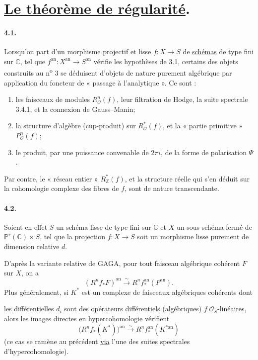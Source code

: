 \documentclass[10pt,leqno]{article}
\newcommand{\C}{\mathbb C}
\newcommand{\Z}{\mathbb Z}
\newcommand{\Pj}{\mathbb P}
\newcommand{\cO}{\mathcal O}
\theoremstyle{deligne}
\renewcommand{\underline}[1]{\uline{#1}}
\begin{document}
\section{\underline{Le théorème de régularité}.}

\paragraph{4.1.}
Lorsqu'on part d'un morphisme projectif et lisse $f:X\to S$ de \underline{schémas} de type fini sur $\C$, tel que $f^{\mathrm{an}}:X^{\mathrm{an}}\to S^{\mathrm{an}}$ vérifie les hypothèses de 3.1, certains des objets construits au n\textsuperscript{o} 3 se déduisent d'objets de nature purement algébrique par application du foncteur de « passage à l'analytique ». Ce sont :
\begin{enumerate}[label=\alph*)]
\item les faisceaux de modules $R_\cO^n(f)$, leur filtration de Hodge, la suite spectrale 3.4.1, et la connexion de Gauss--Manin;
\item la structure d'algèbre (cup-produit) sur $R_\cO^*(f)$, et la « partie primitive » $P_\cO^n(f)$;
\item le produit, par une puissance convenable de $2\pi i$, de la forme de polarisation $\Psi$.
\end{enumerate}
Par contre, le « réseau entier » $R_\Z^*(f)$, et la structure réelle qui s'en déduit sur la cohomologie complexe des fibres de $f$, sont de nature transcendante.

\paragraph{4.2.}
Soient en effet $S$ un schéma lisse de type fini sur $\C$ et $X$ un sous-schéma fermé de $\Pj^r(\C)\times S$, tel que la projection $f:X\to S$ soit un morphisme lisse purement de dimension relative $d$.

D'après la variante relative de GAGA, pour tout faisceau algébrique cohérent $F$ sur $X$, on a
\[
(R^nf_*F)^{\mathrm{an}}\xrightarrow{\sim}R^nf_*^{\mathrm{an}}(F^{\mathrm{an}}).
\]
Plus généralement, si $K^*$ est un complexe de faisceaux algébriques cohérents dont


les différentielles $d_i$ sont des opérateurs différentiels (algébriques) $f^\cdot\cO_S$-linéaires, alors les images directes en hypercohomologie vérifient
\[
  \bigl(R^n f_*(K^*)\bigr)^{\mathrm{an}}
  \xrightarrow{\sim}
  R^n f_*^{\mathrm{an}}(K^{*\mathrm{an}})
\]
(ce cas se ramène au précédent \underline{via} l'une des suites spectrales d'hypercohomologie).
\end{document}
